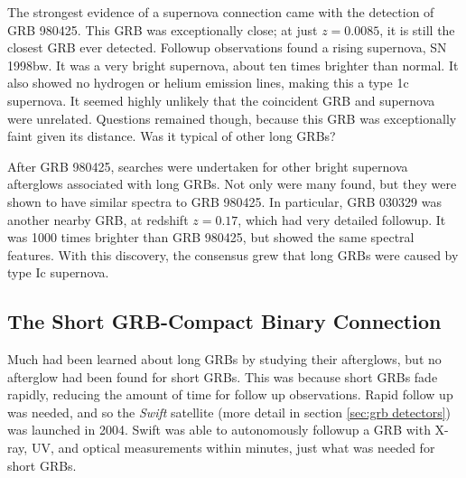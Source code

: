 \documentclass[11pt]{cuthesis}
\begin{document}
The strongest evidence of a supernova connection came with the detection of GRB 980425. This GRB was exceptionally close; at just $z=0.0085$, it is still the closest GRB ever detected. Followup observations found a rising supernova, SN 1998bw. It was a very bright supernova, about ten times brighter than normal. It also showed no hydrogen or helium emission lines, making this a type 1c supernova. It seemed highly unlikely that the coincident GRB and supernova were unrelated. Questions remained though, because this GRB was exceptionally faint given its distance. Was it typical of other long GRBs? 

After GRB 980425, searches were undertaken for other bright supernova afterglows associated with long GRBs. Not only were many found, but they were shown to have similar spectra to GRB 980425. In particular, GRB 030329 was another nearby GRB, at redshift $z=0.17$, which had very detailed followup. It was 1000 times brighter than GRB 980425, but showed the same spectral features. With this discovery, the consensus grew that long GRBs were caused by type Ic supernova.


\subsection{The Short GRB-Compact Binary Connection} \label{sec: short grbs}
Much had been learned about long GRBs by studying their afterglows, but no afterglow had been found for short GRBs. This was because short GRBs fade rapidly, reducing the amount of time for follow up observations. Rapid follow up was needed, and so the \textit{Swift} satellite (more detail in section \ref{sec:grb detectors}) was launched in 2004. Swift was able to autonomously followup a GRB with X-ray, UV, and optical measurements within minutes, just what was needed for short GRBs. 
\end{document}
